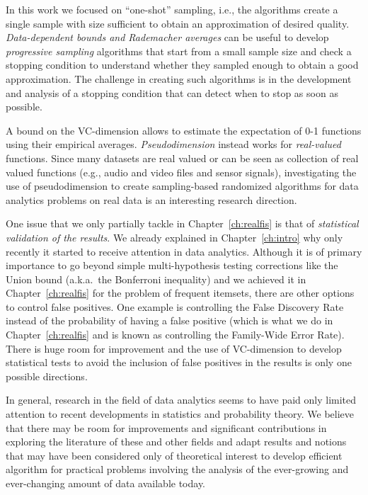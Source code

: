 In this work we focused on ``one-shot'' sampling, i.e., the algorithms create a
single sample with size sufficient to obtain an approximation of desired
quality. \emph{Data-dependent bounds and Rademacher averages} can be
useful to develop \emph{progressive sampling} algorithms that start from a small
sample size and check a stopping condition to understand whether they sampled
enough to obtain a good approximation. The challenge in creating such algorithms
is in the development and analysis of a stopping condition that can detect when
to stop as soon as possible.  

A bound on the VC-dimension allows to estimate the expectation of 0-1 functions
using their empirical averages. \emph{Pseudodimension} instead works for
\emph{real-valued} functions. Since many datasets are real valued or can be seen
as collection of real valued functions (e.g., audio and video files and sensor
signals), investigating the use of pseudodimension to create sampling-based
randomized algorithms for data analytics problems on real data is an interesting
research direction.

One issue that we only partially tackle in Chapter~\ref{ch:realfis} is that of
\emph{statistical validation of the results}. We already explained in
Chapter~\ref{ch:intro} why only recently it started to receive attention in data
analytics. Although it is of primary importance to go beyond
simple multi-hypothesis testing corrections like the Union bound (a.k.a.~the
Bonferroni inequality) and we achieved it in Chapter~\ref{ch:realfis} for the
problem of frequent itemsets, there are other options to control false
positives. One example is controlling the False Discovery
Rate~\citep{BenjiaminiH95} instead of the probability of having a false positive
(which is what we do in Chapter~\ref{ch:realfis} and is known as controlling the
Family-Wide Error Rate). There is huge room for improvement and the use of
VC-dimension to develop statistical tests to avoid the inclusion of false
positives in the results is only one possible directions. 

In general, research in the field of data analytics seems to have paid only
limited attention to recent developments in statistics and probability theory. We
believe that there may be room for improvements and significant contributions in
exploring the literature of these and other fields and adapt results and notions
that may have been considered only of theoretical interest to develop efficient
algorithm for practical problems involving the analysis of the ever-growing and
ever-changing amount of data available today.

